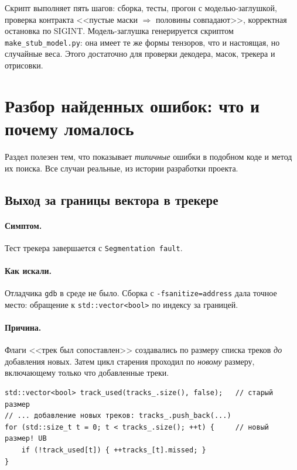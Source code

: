 \documentclass[11pt,a4paper]{article}
\theoremstyle{definition}
\theoremstyle{remark}
\begin{document}
Скрипт выполняет пять шагов: сборка, тесты, прогон с моделью-заглушкой,
проверка контракта <<пустые маски $\Rightarrow$ половины совпадают>>,
корректная остановка по SIGINT. Модель-заглушка генерируется скриптом
\texttt{make\_stub\_model.py}: она имеет те же формы тензоров, что и настоящая,
но случайные веса. Этого достаточно для проверки декодера, масок, трекера и
отрисовки.

\section{Разбор найденных ошибок: что и почему ломалось}

Раздел полезен тем, что показывает \emph{типичные} ошибки в подобном коде и
метод их поиска. Все случаи реальные, из истории разработки проекта.

\subsection{Выход за границы вектора в трекере}

\paragraph{Симптом.} Тест трекера завершается с \texttt{Segmentation fault}.

\paragraph{Как искали.} Отладчика \texttt{gdb} в среде не было. Сборка с
\texttt{-fsanitize=address} дала точное место: обращение к
\texttt{std::vector<bool>} по индексу за границей.

\paragraph{Причина.} Флаги <<трек был сопоставлен>> создавались по размеру
списка треков \emph{до} добавления новых. Затем цикл старения проходил по
\emph{новому} размеру, включающему только что добавленные треки.

\begin{lstlisting}
std::vector<bool> track_used(tracks_.size(), false);   // старый размер
// ... добавление новых треков: tracks_.push_back(...)
for (std::size_t t = 0; t < tracks_.size(); ++t) {     // новый размер! UB
    if (!track_used[t]) { ++tracks_[t].missed; }
}
\end{lstlisting}
\end{document}
